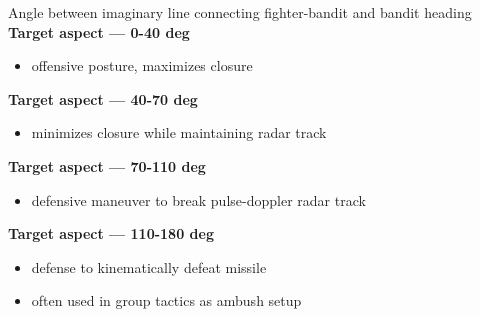 \begin{tcoloritemize}
    Angle between imaginary line connecting fighter-bandit and bandit heading
    \blueitem[Hot]
    \textbf{Target aspect --- 0-40 deg}
    \begin{itemize}
        \item offensive posture, maximizes closure
    \end{itemize}
    \blueitem[Flank]
    \textbf{Target aspect --- 40-70 deg}
    \begin{itemize}
        \item minimizes closure while maintaining radar track
    \end{itemize}
    \blueitem[Beam]
    \textbf{Target aspect --- 70-110 deg}
    \begin{itemize}
        \item defensive maneuver to break pulse-doppler radar track
    \end{itemize}
    \blueitem[Drag]
    \textbf{Target aspect --- 110-180 deg}
    \begin{itemize}
        \item defense to kinematically defeat missile
        \item often used in group tactics as ambush setup
    \end{itemize}
\end{tcoloritemize}

